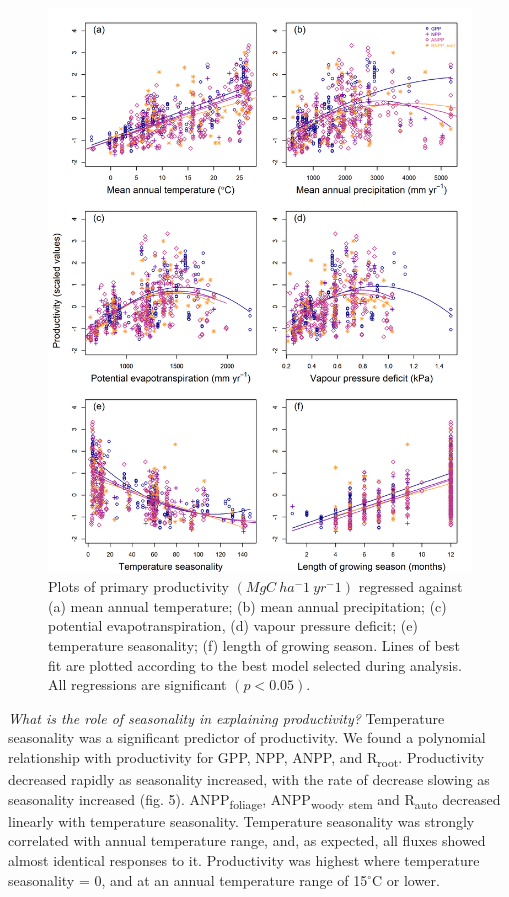 \documentclass[]{article}
\begin{document}
\begin{figure}[H]
\includegraphics[width=1\linewidth]{combined_plots} \caption{Plots of primary productivity $(MgC~ha^-1~yr^-1)$ regressed against (a) mean annual temperature; (b) mean annual precipitation; (c) potential evapotranspiration, (d) vapour pressure deficit; (e) temperature seasonality; (f) length of growing season. Lines of best fit are plotted according to the best model selected during analysis. All regressions are significant $(p<0.05)$.}\label{fig:unnamed-chunk-9}
\end{figure}

\emph{What is the role of seasonality in explaining productivity?}
Temperature seasonality was a significant predictor of productivity. We
found a polynomial relationship with productivity for GPP, NPP, ANPP,
and R\textsubscript{root}. Productivity decreased rapidly as seasonality
increased, with the rate of decrease slowing as seasonality increased
(fig. 5). ANPP\textsubscript{foliage}, ANPP\textsubscript{woody}
\textsubscript{stem} and R\textsubscript{auto} decreased linearly with
temperature seasonality. Temperature seasonality was strongly correlated
with annual temperature range, and, as expected, all fluxes showed
almost identical responses to it. Productivity was highest where
temperature seasonality = 0, and at an annual temperature range of
15\(^\circ\)C or lower.
\end{document}
